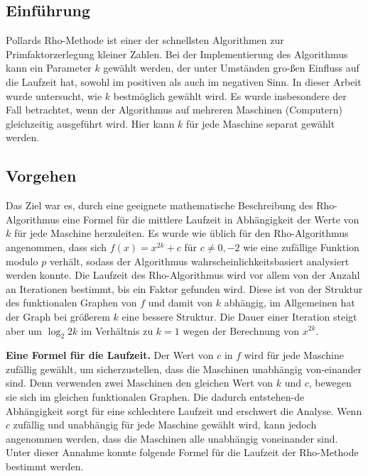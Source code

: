 \documentclass[a4paper, extrafontsizes, ngerman, 25pt]{memoir}
\begin{document}
\subsection{Einführung}

Pollards Rho-Methode ist einer der schnellsten Algorithmen zur Primfaktorzerlegung kleiner Zahlen. Bei der Implementierung des Algorithmus kann ein Parameter $k$ gewählt werden, der unter Umständen gro-ßen Einfluss auf die Laufzeit hat, sowohl im positiven als auch im negativen Sinn. In dieser Arbeit wurde untersucht, wie $k$ bestmöglich gewählt wird. Es wurde insbesondere der Fall betrachtet, wenn der Algorithmus auf mehreren Maschinen (Computern) gleichzeitig ausgeführt wird. Hier kann $k$ für jede Maschine separat gewählt werden.

\newpage

\subsection{Vorgehen}

Das Ziel war es, durch eine geeignete mathematische Beschreibung des Rho-Algorithmus eine Formel für die mittlere Laufzeit in Abhängigkeit der Werte von $k$ für jede Maschine herzuleiten. Es wurde wie üblich für den Rho-Algorithmus angenommen, dass sich $f(x) = x^{2k} + c$ für $c \ne 0, -2$ wie eine zufällige Funktion modulo $p$ verhält, sodass der Algorithmus wahrscheinlichkeitsbasiert analysiert werden konnte. Die Laufzeit des Rho-Algorithmus wird vor allem von der Anzahl an Iterationen bestimmt, bis ein Faktor gefunden wird. Diese ist von der Struktur des funktionalen Graphen von $f$ und damit von $k$ abhängig, im Allgemeinen hat der Graph bei größerem $k$ eine bessere Struktur. Die Dauer einer Iteration steigt aber um $\log_2 2k$ im Verhältnis zu $k = 1$ wegen der Berechnung von $x^{2k}$.

\vspace{0.5cm}
\noindent \textbf{Eine Formel für die Laufzeit.} Der Wert von $c$ in $f$ wird für jede Maschine zufällig gewählt, um sicherzustellen, dass die Maschinen unabhängig von-einander sind. Denn verwenden zwei Maschinen den gleichen Wert von $k$ und $c$, bewegen sie sich im gleichen funktionalen Graphen. Die dadurch entstehen-de Abhängigkeit sorgt für eine schlechtere Laufzeit und erschwert die Analyse. Wenn $c$ zufällig und unabhängig für jede Maschine gewählt wird, kann jedoch angenommen werden, dass die Maschinen alle unabhängig voneinander sind. Unter dieser Annahme konnte folgende Formel für die Laufzeit der Rho-Methode bestimmt werden.
\end{document}
